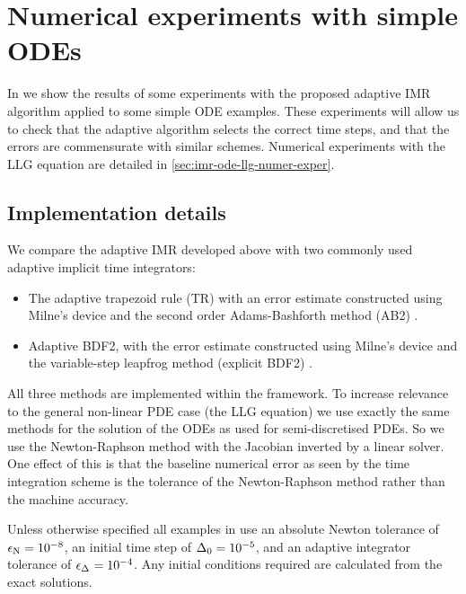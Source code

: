\section{Numerical experiments with simple ODEs}
\label{sec:aimr-testing}



In  we show the results of some experiments with the proposed adaptive IMR algorithm applied to some simple ODE examples.
These experiments will allow us to check that the adaptive algorithm selects the correct time steps, and that the errors are commensurate with similar schemes.
Numerical experiments with the LLG equation are detailed in \cref{sec:imr-ode-llg-numer-exper}.


\subsection{Implementation details}
\label{sec:aimr-implementation}

We compare the adaptive IMR developed above with two commonly used adaptive implicit time integrators:
\begin{itemize}
\item The adaptive trapezoid rule (TR) with an error estimate constructed using Milne's device and the second order Adams-Bashforth method (AB2) \cite[707]{GreshoSani}.
\item Adaptive BDF2, with the error estimate constructed using Milne's device and the variable-step leapfrog method (\ie explicit BDF2) \cite[715]{GreshoSani}.
\end{itemize}

All three methods are implemented within the \oomph framework.
To increase relevance to the general non-linear PDE case (\ie the LLG equation) we use exactly the same methods for the solution of the ODEs as used for semi-discretised PDEs.
So we use the Newton-Raphson method with the Jacobian inverted by a linear solver.
One effect of this is that the baseline numerical error as seen by the time integration scheme is the tolerance of the Newton-Raphson method rather than the machine accuracy.

Unless otherwise specified all examples in  use an absolute Newton tolerance of $\epsilon_{\mathrm{N}} = 10^{-8}$, an initial time step of $\Delta_{0} = 10^{-5}$, and an adaptive integrator tolerance of $\epsilon_{\Delta_{}} = 10^{-4}$.
Any initial conditions required are calculated from the exact solutions.

